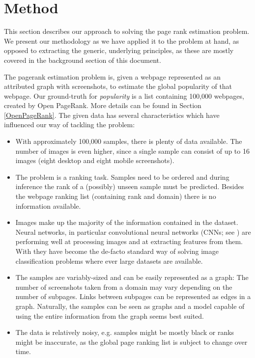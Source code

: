 \section{Method}
\label{sec:method}

This section describes our approach to solving the page rank estimation problem. We present our methodology as we have applied it to the problem at hand, as opposed to extracting the generic, underlying principles, as these are mostly covered in the background section of this document.

The pagerank estimation problem is, given a webpage represented as an attributed graph with screenshots, to estimate the global popularity of that webpage.
Our ground-truth for \textit{popularity} is a list containing 100,000 webpages, created by Open PageRank.
More details can be found in Section \ref{OpenPageRank}.
The given data has several characteristics which have influenced our way of tackling the problem:

\begin{itemize}
    \item With approximately 100,000 samples, there is plenty of data available. The number of images is even higher, since a single sample can consist of up to 16 images (eight desktop and eight mobile screenshots).
    \item The problem is a ranking task. Samples need to be ordered and during inference the rank of a (possibly) unseen sample must be predicted. Besides the webpage ranking list (containing rank and domain) there is no information available.
    \item Images make up the majority of the information contained in the dataset. Neural networks, in particular convolutional neural networks (CNNs; see \cite{lecun1989backpropagation}) are performing well at processing images and at extracting features from them. With \cite{krizhevsky:imagenet} they have become the de-facto standard way of solving image classification problems where ever large datasets are available.
    \item The samples are variably-sized and can be easily represented as a graph: The number of screenshots taken from a domain may vary depending on the number of subpages. Links between subpages can be represented as edges in a graph. Naturally, the samples can be seen as graphs and a model capable of using the entire information from the graph seems best suited.
    \item The data is relatively noisy, e.g. samples might be mostly black or ranks might be inaccurate, as the global page ranking list is subject to change over time.
\end{itemize}


